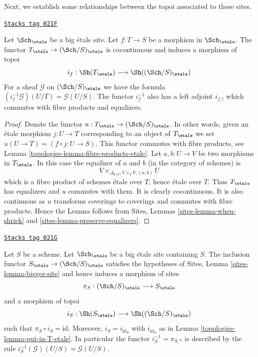 Next, we establish some relationships between the topoi
associated to these sites.

\begin{lemma}
\label{topologies-lemma-put-in-T-etale}
\href{https://stacks.math.columbia.edu/tag/021F}{\texttt{Stacks tag 021F}}

Let $\Sch_\etale$ be a big \'etale site.
Let $f : T \to S$ be a morphism in $\Sch_\etale$.
The functor $T_\etale \to (\Sch/S)_\etale$
is cocontinuous and induces a morphism of topoi
$$
i_f :
\Sh(T_\etale)
\longrightarrow
\Sh((\Sch/S)_\etale)
$$
For a sheaf $\mathcal{G}$ on $(\Sch/S)_\etale$
we have the formula $(i_f^{-1}\mathcal{G})(U/T) = \mathcal{G}(U/S)$.
The functor $i_f^{-1}$ also has a left adjoint $i_{f, !}$ which commutes
with fibre products and equalizers.
\end{lemma}

\begin{proof}

Denote the functor $u : T_\etale \to (\Sch/S)_\etale$.
In other words, given an \'etale morphism $j : U \to T$ corresponding
to an object of $T_\etale$ we set $u(U \to T) = (f \circ j : U \to S)$.
This functor commutes with fibre products, see
Lemma \ref{topologies-lemma-fibre-products-etale}.
Let $a, b : U \to V$ be two morphisms in $T_\etale$.
In this case the equalizer of $a$ and $b$ (in the category of schemes) is
$$
V \times_{\Delta_{V/T}, V \times_T V, (a, b)} U
$$
which is a fibre product of schemes \'etale over $T$, hence \'etale
over $T$. Thus $T_\etale$ has equalizers and $u$ commutes with them.
It is clearly cocontinuous.
It is also continuous as $u$ transforms coverings to coverings and
commutes with fibre products. Hence the Lemma follows from
Sites, Lemmas \ref{sites-lemma-when-shriek}
and \ref{sites-lemma-preserve-equalizers}.
\end{proof}

\begin{lemma}
\label{topologies-lemma-at-the-bottom-etale}
\href{https://stacks.math.columbia.edu/tag/021G}{\texttt{Stacks tag 021G}}

Let $S$ be a scheme. Let $\Sch_\etale$ be a big \'etale
site containing $S$.
The inclusion functor $S_\etale \to (\Sch/S)_\etale$
satisfies the hypotheses of Sites, Lemma \ref{sites-lemma-bigger-site}
and hence induces a morphism of sites
$$
\pi_S : (\Sch/S)_\etale \longrightarrow S_\etale
$$
and a morphism of topoi
$$
i_S : \Sh(S_\etale) \longrightarrow \Sh((\Sch/S)_\etale)
$$
such that $\pi_S \circ i_S = \text{id}$. Moreover, $i_S = i_{\text{id}_S}$
with $i_{\text{id}_S}$ as in Lemma \ref{topologies-lemma-put-in-T-etale}.
In particular the functor $i_S^{-1} = \pi_{S, *}$ is described by the rule
$i_S^{-1}(\mathcal{G})(U/S) = \mathcal{G}(U/S)$.
\end{lemma}

